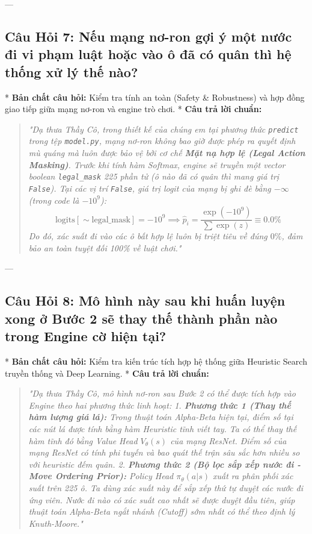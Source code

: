 \documentclass[11pt,a4paper]{report}
\begin{document}
---

\subsection*{Câu Hỏi 7: Nếu mạng nơ-ron gợi ý một nước đi vi phạm luật hoặc vào ô đã có quân thì hệ thống xử lý thế nào?}
* \textbf{Bản chất câu hỏi:} Kiểm tra tính an toàn (Safety \& Robustness) và hợp đồng giao tiếp giữa mạng nơ-ron và engine trò chơi.
* \textbf{Câu trả lời chuẩn:}
  \begin{quote}
  \textit{"Dạ thưa Thầy Cô, trong thiết kế của chúng em tại phương thức \texttt{predict} trong tệp \texttt{model.py}, mạng nơ-ron không bao giờ được phép ra quyết định mù quáng mà luôn được bảo vệ bởi cơ chế \textbf{Mặt nạ hợp lệ (Legal Action Masking)}.
  Trước khi tính hàm Softmax, engine sẽ truyền một vector boolean \texttt{legal\_mask} 225 phần tử (ô nào đã có quân thì mang giá trị \texttt{False}). Tại các vị trí \texttt{False}, giá trị logit của mạng bị ghi đè bằng $-\infty$ (trong code là $-10^9$):
  \begin{equation}
      \text{logits}[\sim \text{legal\_mask}] = -10^9 \implies \hat{p}_i = \frac{\exp(-10^9)}{\sum \exp(z)} \equiv 0.0\%
  \end{equation}
  Do đó, xác suất đi vào các ô bất hợp lệ luôn bị triệt tiêu về đúng $0\%$, đảm bảo an toàn tuyệt đối 100\% về luật chơi."}
  \end{quote}

---

\subsection*{Câu Hỏi 8: Mô hình này sau khi huấn luyện xong ở Bước 2 sẽ thay thế thành phần nào trong Engine cờ hiện tại?}
* \textbf{Bản chất câu hỏi:} Kiểm tra kiến trúc tích hợp hệ thống giữa Heuristic Search truyền thống và Deep Learning.
* \textbf{Câu trả lời chuẩn:}
  \begin{quote}
  \textit{"Dạ thưa Thầy Cô, mô hình nơ-ron sau Bước 2 có thể được tích hợp vào Engine theo hai phương thức linh hoạt:
  1. \textbf{Phương thức 1 (Thay thế hàm lượng giá lá):} Trong thuật toán Alpha-Beta hiện tại, điểm số tại các nút lá được tính bằng hàm Heuristic tĩnh viết tay. Ta có thể thay thế hàm tĩnh đó bằng Value Head $V_\theta(s)$ của mạng ResNet. Điểm số của mạng ResNet có tính phi tuyến và bao quát thế trận sâu sắc hơn nhiều so với heuristic đếm quân.
  2. \textbf{Phương thức 2 (Bộ lọc sắp xếp nước đi - Move Ordering Prior):} Policy Head $\pi_\theta(a|s)$ xuất ra phân phối xác suất trên 225 ô. Ta dùng xác suất này để sắp xếp thứ tự duyệt các nước đi ứng viên. Nước đi nào có xác suất cao nhất sẽ được duyệt đầu tiên, giúp thuật toán Alpha-Beta ngắt nhánh (Cutoff) sớm nhất có thể theo định lý Knuth-Moore."}
  \end{quote}
\end{document}
